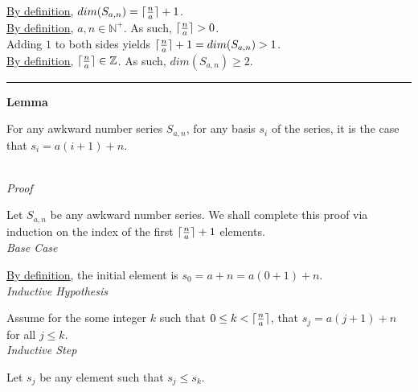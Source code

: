 \documentclass[a4paper,12pt]{article}
\DeclarePairedDelimiter{\ceil}{\lceil}{\rceil}
\begin{document}
\noindent \hyperlink{definition:dimension}{By definition}, $dim(S_{a, n}) = \ceil{\frac{n}{a}} + 1$.\\

\noindent \hyperlink{definition:awkward_number_series}{By definition}, $a, n \in \mathbb{N}^+$. As such, $\ceil{\frac{n}{a}} > 0$.\\

\noindent Adding $1$ to both sides yields $\ceil{\frac{n}{a}} + 1 = dim(S_{a, n}) > 1$.\\

\noindent \hyperlink{definition:ceiling_function}{By definition}, $\ceil{\frac{n}{a}} \in \mathbb{Z}$. As such, $dim(S_{a, n}) \geq 2$. 



\begin{center}
\noindent\rule{8cm}{0.4pt}
\end{center}








\label{lemma:basis_lengths}
\hypertarget{lemma:basis_lengths}{}
\begin{tcolorbox}
\textbf{Lemma}

For any awkward number series $S_{a,n}$, for any basis $s_i$ of the series, it is the case that $s_i = a(i + 1) + n$.
\end{tcolorbox}

\noindent \\
\textit{Proof}

\noindent Let $S_{a,n}$ be any awkward number series. We shall complete this proof via induction on the index of the first $\ceil{\frac{n}{a}} + 1$ elements.\\


\noindent
\textit{Base Case}

\noindent \hyperlink{definition:awkward_number_series}{By definition}, the initial element is $s_0 = a + n = a(0 + 1) + n$.\\


\noindent
\textit{Inductive Hypothesis}

\noindent Assume for the some integer $k$ such that $0 \leq k < \ceil{\frac{n}{a}}$, that $s_j = a(j + 1) + n$ for all $j \leq k$.\\

\noindent
\textit{Inductive Step}

\noindent Let $s_j$ be any element such that $s_j \leq s_k$.\\
\end{document}
